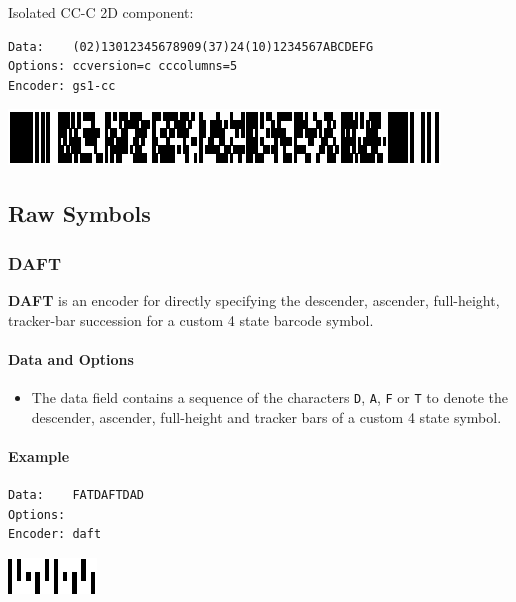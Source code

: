 Isolated CC-C 2D component:

\begin{verbatim}
Data:    (02)13012345678909(37)24(10)1234567ABCDEFG
Options: ccversion=c cccolumns=5
Encoder: gs1-cc
\end{verbatim}

\includegraphics{images/gs1composite-3.eps}

\hypertarget{raw-symbols}{%
\subsection{Raw Symbols}\label{raw-symbols}}

\hypertarget{daft}{%
\subsubsection{DAFT}\label{daft}}

\textbf{DAFT} is an encoder for directly specifying the descender,
ascender, full-height, tracker-bar succession for a custom 4 state
barcode symbol.

\hypertarget{data-and-options-80}{%
\paragraph{Data and Options}\label{data-and-options-80}}

\begin{itemize}
\tightlist
\item
  The data field contains a sequence of the characters \texttt{D},
  \texttt{A}, \texttt{F} or \texttt{T} to denote the descender,
  ascender, full-height and tracker bars of a custom 4 state symbol.
\end{itemize}

\hypertarget{example-20}{%
\paragraph{Example}\label{example-20}}

\begin{verbatim}
Data:    FATDAFTDAD
Options: 
Encoder: daft
\end{verbatim}

\includegraphics{images/daft-1.eps}

